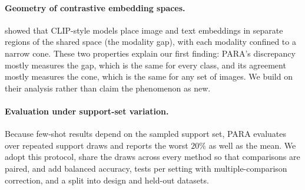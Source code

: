 \paragraph{Geometry of contrastive embedding spaces.}
\citet{liang2022mind} showed that CLIP-style models place image and text embeddings in separate regions of the shared space (the modality gap),
with each modality confined to a narrow cone.
These two properties explain our first finding: PARA's discrepancy mostly measures the gap, which is the same for every class,
and its agreement mostly measures the cone, which is the same for any set of images.
We build on their analysis rather than claim the phenomenon as new.

\paragraph{Evaluation under support-set variation.}
Because few-shot results depend on the sampled support set, PARA evaluates over repeated support draws and reports the worst $20\%$ as well as the mean.
We adopt this protocol, share the draws across every method so that comparisons are paired,
and add balanced accuracy, tests per setting with multiple-comparison correction, and a split into design and held-out datasets.
